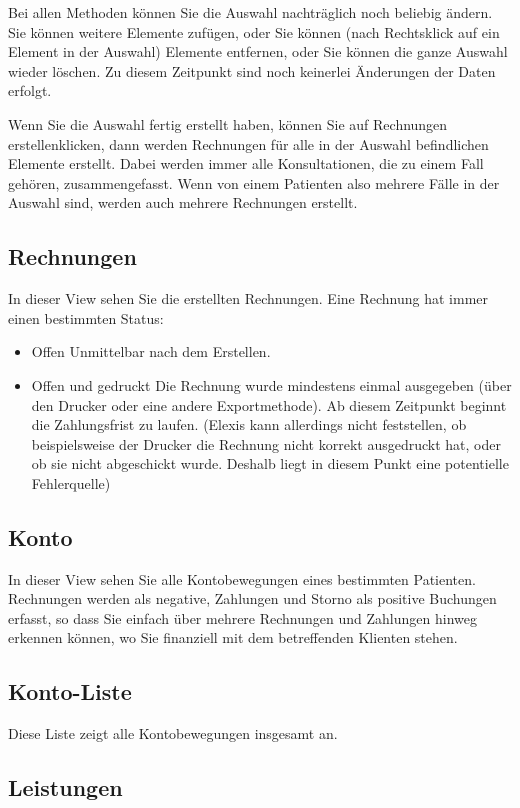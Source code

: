 Bei allen Methoden können Sie die Auswahl nachträglich noch beliebig ändern. Sie
können weitere Elemente zufügen, oder Sie können (nach Rechtsklick auf ein
Element in der Auswahl) Elemente entfernen, oder Sie können die ganze Auswahl
wieder löschen. Zu diesem Zeitpunkt sind noch keinerlei Änderungen der Daten
erfolgt.

Wenn Sie die Auswahl fertig erstellt haben, können Sie auf \glqq Rechnungen
erstellen\grqq klicken, dann werden Rechnungen für alle in der Auswahl
befindlichen Elemente erstellt. Dabei werden immer alle Konsultationen, die zu
einem Fall gehören, zusammengefasst. Wenn von einem Patienten also mehrere Fälle
in der Auswahl sind, werden auch mehrere Rechnungen erstellt.

\subsection{Rechnungen}
In dieser View sehen Sie die erstellten Rechnungen. Eine Rechnung hat immer einen bestimmten Status:
\begin{itemize}
    \item {Offen} Unmittelbar nach dem Erstellen.
    \item{Offen und gedruckt} Die Rechnung wurde mindestens einmal ausgegeben (über den Drucker oder eine andere Exportmethode). Ab diesem Zeitpunkt beginnt die Zahlungsfrist zu laufen. (Elexis kann allerdings nicht feststellen, ob beispielsweise der Drucker die Rechnung nicht korrekt ausgedruckt hat, oder ob sie nicht abgeschickt wurde. Deshalb liegt in diesem Punkt eine potentielle Fehlerquelle)
\end{itemize}

\subsection{Konto}
In dieser View sehen Sie alle Kontobewegungen eines bestimmten Patienten.
Rechnungen werden als negative, Zahlungen und Storno als positive
Buchungen erfasst, so dass Sie einfach über mehrere Rechnungen und Zahlungen
hinweg erkennen können, wo Sie finanziell mit dem betreffenden Klienten stehen.

\subsection{Konto-Liste}
Diese Liste zeigt alle Kontobewegungen insgesamt an.

\subsection{Leistungen}




